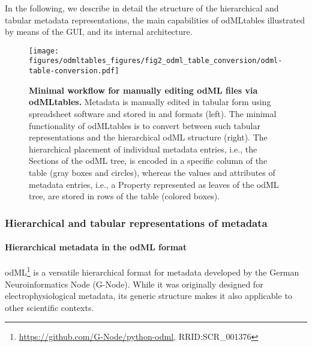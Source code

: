 {In the following, we describe in detail the structure of the hierarchical and tabular metadata representations, the main capabilities of odMLtables illustrated by means of the GUI, and its internal architecture. 


\begin{figure}[!ht]
\begin{center}
\texttt{[image: figures/odmltables\_figures/fig2\_odml\_table\_conversion/odml-table-conversion.pdf]}
\caption[Minimal workflow for manually editing odML files via odMLtables]{{\label{fig:min_workflow}
\textbf{Minimal workflow for manually editing odML files via odMLtables.} Metadata is manually edited in tabular form using spreadsheet software and stored in  and  formats (left). The minimal functionality of odMLtables is to convert between such tabular representations and the hierarchical odML structure (right). The hierarchical placement of individual metadata entries, i.e., the Sections of the odML tree, is encoded in a specific column of the table (gray boxes and circles), whereas the values and attributes of metadata entries, i.e., a Property represented as leaves of the odML tree, are stored in rows of the table (colored boxes).%
}}
\end{center}
\end{figure}

\subsubsection{Hierarchical and tabular representations of metadata}
\label{sec:Hierarchical-Tabular}

\paragraph{Hierarchical metadata in the odML format}
\label{sec:subodML}

odML\footnote{\url{https://github.com/G-Node/python-odml}, RRID:SCR\_001376} is a versatile hierarchical format for metadata \citep{Grewe_2011} developed by the German Neuroinformatics Node (G-Node). While it was originally designed for electrophysiological metadata, its generic structure makes it also applicable to other scientific contexts.

}
